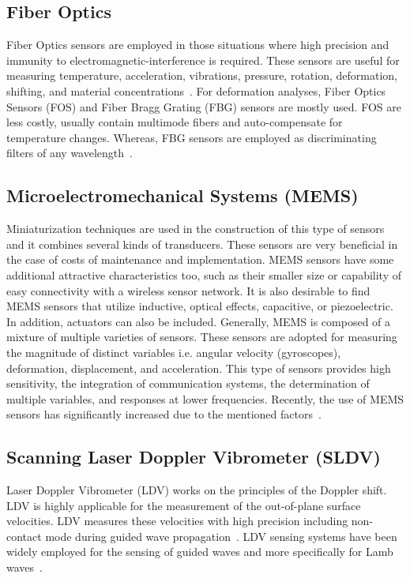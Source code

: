 \documentclass[b5paper, 11pt, titlepage]{book}
\begin{document}
\subsection{Fiber Optics}
Fiber Optics sensors are employed in those situations where high precision and immunity to electromagnetic-interference is required. These sensors are useful for measuring temperature, acceleration, vibrations, pressure, rotation, deformation, shifting, and material concentrations~\cite{TibaduizaBurgos2020}. For deformation analyses, Fiber Optics Sensors (FOS) and Fiber Bragg Grating (FBG) sensors are mostly used. FOS are less costly, usually contain multimode fibers and auto-compensate for temperature changes. Whereas, FBG sensors are employed as discriminating filters of any wavelength~\cite{TibaduizaBurgos2020}. 

\subsection{Microelectromechanical Systems (MEMS)}
Miniaturization techniques are used in the construction of this type of sensors and it combines several kinds of transducers. These sensors are very beneficial in the case of costs of maintenance and implementation. MEMS sensors have some additional attractive characteristics too, such as their smaller size or capability of easy connectivity with a wireless sensor network. It is also desirable to find MEMS sensors that utilize inductive, optical effects, capacitive, or piezoelectric. In addition, actuators can also be included. Generally, MEMS is composed of a mixture of multiple varieties of sensors. These sensors are adopted for measuring the magnitude of distinct variables i.e. angular velocity (gyroscopes), deformation, displacement, and acceleration. This type of sensors provides high sensitivity, the integration of communication systems, the determination of multiple variables, and responses at lower frequencies. Recently, the use of MEMS sensors has significantly increased due to the mentioned factors~\cite{Farrar2012, TibaduizaBurgos2020}.

\subsection{Scanning Laser Doppler Vibrometer (SLDV)}
Laser Doppler Vibrometer (LDV) works on the principles of the Doppler shift.  LDV is highly applicable for the measurement of the out-of-plane surface velocities. LDV measures these velocities with high precision including non-contact mode during guided wave propagation~\cite{Mitra2016}. LDV sensing systems have been widely employed for the sensing of guided waves and more specifically for Lamb waves~\cite{Mitra2016}. 
\end{document}

